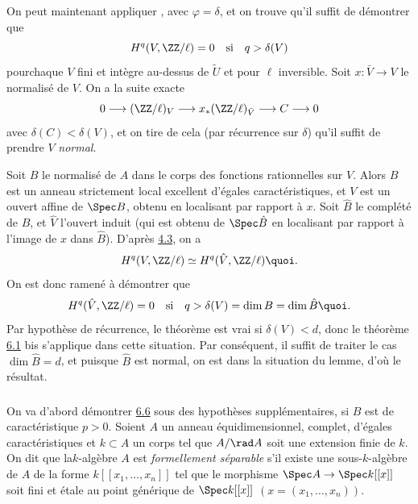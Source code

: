 \documentclass[10pt]{../fichiers-configuration-latex/smfart}
\begin{document}
On peut maintenant appliquer , avec $\varphi=\delta$, et on
trouve qu'il suffit de démontrer que
$$
H^{q}(V,\ZZ/\ell)=0\quad\text{\rm si}\quad q>\delta(V)
$$
pour\pageoriginale chaque $V$ fini et intègre au-dessus de
$\widetilde{U}$ et pour $\ell$ inversible. Soit $x:\bar{V}\rightarrow
V$ le normalisé de $V$. On a la suite exacte
$$
0\longrightarrow (\ZZ/\ell)_{V}\longrightarrow
x_{\ast}(\ZZ/\ell)_{\bar{V}}\longrightarrow C\longrightarrow 0
$$
avec $\delta(C)<\delta(V)$, et on tire de cela (par récurrence sur
$\delta$) qu'il suffit de prendre $V$ \emph{normal}.

Soit $B$ le normalisé de $A$ dans le corps des fonctions rationnelles
sur $V$. Alors $B$ est un anneau strictement local excellent d'égales
caractéristiques, et $V$ est un ouvert affine de $\Spec B$, obtenu en
localisant par rapport à $x$. Soit $\hat{B}$ le complété de $B$, et
$\hat{V}$ l'ouvert induit (qui est obtenu de $\Spec \hat{B}$ en
localisant par rapport à l'image de $x$ dans $\hat{B}$). D'après \hyperref[XIX.cor4.3]{4.3},
on a
$$
H^{q}(V,\ZZ/\ell)\simeq H^{q}(\hat{V},\ZZ/\ell){\quoi}.
$$
On est donc ramené à démontrer que
$$
H^{q}(\hat{V},\ZZ/\ell)=0\quad\text{\rm si}\quad q>\delta
(V)=\dim B=\dim \hat{B}{\quoi}.
$$
Par hypothèse de récurrence, le théorème est vrai si $\delta(V)<d$,
donc le théorème \hyperref[XIX.thm6.1]{6.1} bis s'applique dans cette situation. Par
conséquent, il suffit de traiter le cas $\dim \hat{B}=d$, et puisque
$\hat{B}$ est normal, on est dans la situation du lemme, d'où le
résultat.

\setcounter{subsection}{7}
\setcounter{subsubsection}{-1}
\subsubsection{}
On va d'abord démontrer \hyperref[XIX.lem6.6]{6.6} sous des hypothèses
supplémentaires, si 
$B$ est de caractéristique $p>0$. Soient $A$ un anneau
équidimensionnel, complet, d'égales caractéristiques et $k\subset A$ un
corps tel que $A/\rad A$ soit une extension finie de $k$. On dit que
la\pageoriginale $k$-algèbre $A$ est \emph{formellement séparable}
s'il existe une sous-$k$-algèbre de $A$ de la forme
$k[[x_{1},\ldots,x_{n}]]$ tel que le morphisme $\Spec A\rightarrow
\Spec k[[x]]$ soit fini et étale au point générique de $\Spec k[[x]]$
$(x=(x_{1},\ldots,x_{n}))$.
\end{document}
